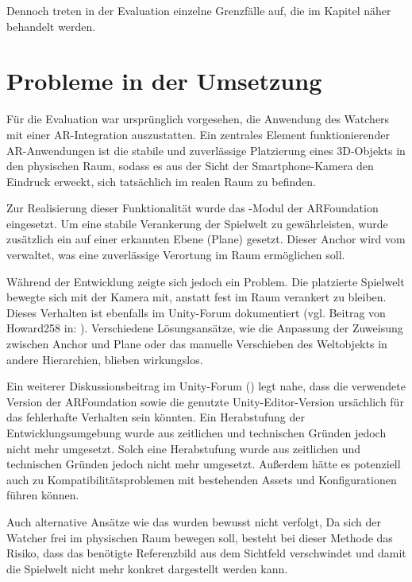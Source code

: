 Dennoch treten in der Evaluation einzelne Grenzfälle auf, die im Kapitel  näher behandelt werden.

\section{Probleme in der Umsetzung}

Für die Evaluation war ursprünglich vorgesehen, die Anwendung des Watchers mit einer \ac{AR}-Integration auszustatten. Ein zentrales Element funktionierender \ac{AR}-Anwendungen ist die stabile und zuverlässige Platzierung eines \ac{3D}-Objekts in den physischen Raum, sodass es aus der Sicht der Smartphone-Kamera den Eindruck erweckt, sich tatsächlich im realen Raum zu befinden.

Zur Realisierung dieser Funktionalität wurde das -Modul der ARFoundation eingesetzt. Um eine stabile Verankerung der Spielwelt zu gewährleisten, wurde zusätzlich ein  auf einer erkannten Ebene (Plane) gesetzt. Dieser Anchor wird vom  verwaltet, was eine zuverlässige Verortung im Raum ermöglichen soll.

Während der Entwicklung zeigte sich jedoch ein Problem. Die platzierte Spielwelt bewegte sich mit der Kamera mit, anstatt fest im Raum verankert zu bleiben. Dieses Verhalten ist ebenfalls im Unity-Forum dokumentiert (vgl. Beitrag von Howard258 in: \citealp{noauthor_unity_2025}). Verschiedene Lösungsansätze, wie die Anpassung der Zuweisung zwischen Anchor und Plane oder das manuelle Verschieben des Weltobjekts in andere Hierarchien, blieben wirkungslos.

Ein weiterer Diskussionsbeitrag im Unity-Forum (\citealp{noauthor_ar_2023}) legt nahe, dass die verwendete Version der ARFoundation sowie die genutzte Unity-Editor-Version ursächlich für das fehlerhafte Verhalten sein könnten. Ein Herabstufung der Entwicklungsumgebung wurde aus zeitlichen und technischen Gründen jedoch nicht mehr umgesetzt. Solch eine Herabstufung wurde aus zeitlichen und technischen Gründen jedoch nicht mehr umgesetzt. Außerdem hätte es potenziell auch zu Kompatibilitätsproblemen mit bestehenden Assets und Konfigurationen führen können.

Auch alternative Ansätze wie das  wurden bewusst nicht verfolgt, Da sich der Watcher frei im physischen Raum bewegen soll, besteht bei dieser Methode das Risiko, dass das benötigte Referenzbild aus dem Sichtfeld verschwindet und damit die Spielwelt nicht mehr konkret dargestellt werden kann.
